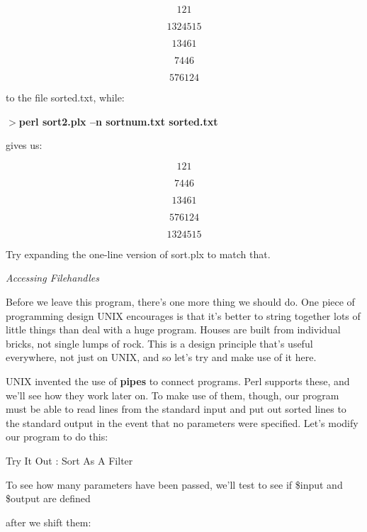 \documentclass[a4paper,11pt]{book}
\begin{document}
\noindent 

\[121\] 

\[1324515\] 

\[13461\] 

\[7446\] 

\[576124\] 


\noindent to the file sorted.txt, while:

\noindent 

\noindent $>$\textbf{perl sort2.plx --n sortnum.txt sorted.txt}

\noindent 

\noindent gives us:

\noindent 

\[121\] 

\[7446\] 

\[13461\] 

\[576124\] 

\[1324515\] 


\noindent Try expanding the one-line version of sort.plx to match that.

\noindent 

\noindent 

\noindent \textit{Accessing Filehandles}

\noindent Before we leave this program, there's one more thing we should do. One piece of programming design UNIX encourages is that it's better to string together lots of little things than deal with a huge program. Houses are built from individual bricks, not single lumps of rock. This is a design principle that's useful everywhere, not just on UNIX, and so let's try and make use of it here.

\noindent 

\noindent UNIX invented the use of \textbf{pipes }to connect programs. Perl supports these, and we'll see how they work later on. To make use of them, though, our program must be able to read lines from the standard input and put out sorted lines to the standard output in the event that no parameters were specified. Let's modify our program to do this:

\noindent 

\noindent Try It Out : Sort As A Filter

\noindent 

\noindent 

\noindent To see how many parameters have been passed, we'll test to see if \$input and \$output are defined

\noindent after we shift them:
\end{document}
